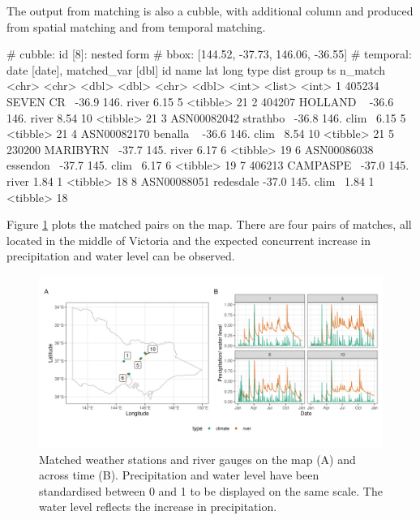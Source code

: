 \documentclass[
]{jss}
\begin{document}
The output from matching is also a cubble, with additional column  and  produced from spatial matching and  from temporal matching.

\begin{CodeChunk}
\begin{CodeOutput}
# cubble:   id [8]: nested form
# bbox:     [144.52, -37.73, 146.06, -36.55]
# temporal: date [date], matched_var [dbl]
  id          name        lat  long type   dist group ts       n_match
  <chr>       <chr>     <dbl> <dbl> <chr> <dbl> <int> <list>     <int>
1 405234      SEVEN CR~ -36.9  146. river  6.15     5 <tibble>      21
2 404207      HOLLAND ~ -36.6  146. river  8.54    10 <tibble>      21
3 ASN00082042 strathbo~ -36.8  146. clim~  6.15     5 <tibble>      21
4 ASN00082170 benalla ~ -36.6  146. clim~  8.54    10 <tibble>      21
5 230200      MARIBYRN~ -37.7  145. river  6.17     6 <tibble>      19
6 ASN00086038 essendon~ -37.7  145. clim~  6.17     6 <tibble>      19
7 406213      CAMPASPE~ -37.0  145. river  1.84     1 <tibble>      18
8 ASN00088051 redesdale -37.0  145. clim~  1.84     1 <tibble>      18
\end{CodeOutput}
\end{CodeChunk}

Figure \ref{fig:matching} plots the matched pairs on the map. There are four pairs of matches, all located in the middle of Victoria and the expected concurrent increase in precipitation and water level can be observed.

\begin{CodeChunk}
\begin{figure}

{\centering \includegraphics[width=1\linewidth]{../figures/matching} 

}

\caption[Matched weather stations and river gauges on the map (A) and across time (B)]{Matched weather stations and river gauges on the map (A) and across time (B). Precipitation and water level have been standardised between 0 and 1 to be displayed on the same scale. The water level reflects the increase in precipitation.}\label{fig:matching}
\end{figure}
\end{CodeChunk}
\end{document}

